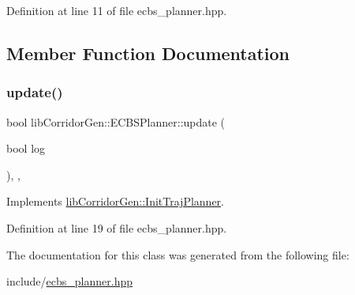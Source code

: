 Definition at line 11 of file ecbs\+\_\+planner.\+hpp.



\subsection{Member Function Documentation}
\mbox{\label{classlib_corridor_gen_1_1_e_c_b_s_planner_a0d4c5855c02228c677b3d2d89c10740c}} 
\subsubsection{\texorpdfstring{update()}{update()}}
{\footnotesize\ttfamily bool lib\+Corridor\+Gen\+::\+E\+C\+B\+S\+Planner\+::update (\begin{DoxyParamCaption}\item[{bool}]{log }\end{DoxyParamCaption})\hspace{0.3cm}{\ttfamily [inline]}, {\ttfamily [override]}, {\ttfamily [virtual]}}



Implements \hyperlink{classlib_corridor_gen_1_1_init_traj_planner_acfc10a68eddb236a10790c4d92473d99}{lib\+Corridor\+Gen\+::\+Init\+Traj\+Planner}.



Definition at line 19 of file ecbs\+\_\+planner.\+hpp.



The documentation for this class was generated from the following file\+:\begin{DoxyCompactItemize}
\item 
include/\hyperlink{ecbs__planner_8hpp}{ecbs\+\_\+planner.\+hpp}\end{DoxyCompactItemize}
